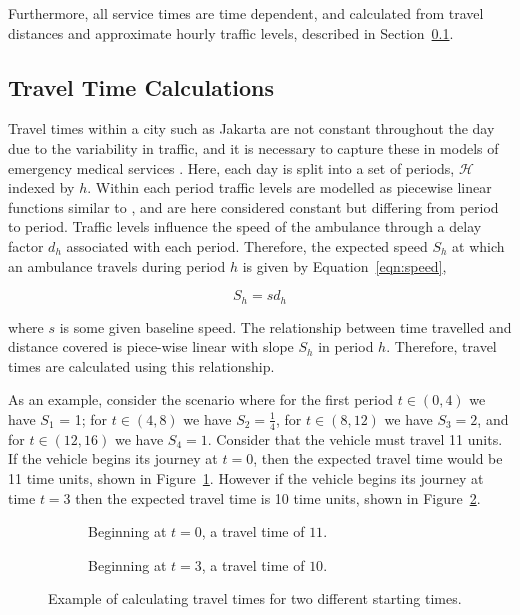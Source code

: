 \documentclass[preprint,12pt]{elsarticle}
\begin{document}
Furthermore, all service times are time dependent, and calculated from travel
distances and approximate hourly traffic levels, described in
Section~\ref{sec:travel_times}.

\subsection{Travel Time Calculations}\label{sec:travel_times}
Travel times within a city such as Jakarta are not constant throughout the day
due to the variability in traffic, and it is necessary to capture these in
models of emergency medical services \citep{schmiddoerner10}.
Here, each day is split into a set of periods, $\mathcal{H}$ indexed by $h$.
Within each period traffic levels are modelled as piecewise linear functions
similar to \cite{horn00}, and are here considered constant but differing from
period to period. Traffic levels influence the speed of the ambulance through a
delay factor $d_h$ associated with each period. Therefore, the expected speed
$S_h$ at which an ambulance travels during period $h$ is given by
Equation~\ref{eqn:speed},

\begin{equation}\label{eqn:speed}
S_h = s d_h
\end{equation}

\noindent
where $s$ is some given baseline speed. The relationship between time travelled
and distance covered is piece-wise linear with slope $S_h$ in period $h$.
Therefore, travel times are calculated using this relationship.

As an example, consider the scenario where for the first period $t \in (0, 4)$
we have $S_1$ = 1; for $t \in (4, 8)$ we have $S_2 = \frac{1}{4}$, for
$t \in (8, 12)$ we have $S_3 = 2$, and for $t \in (12, 16)$ we have $S_4 = 1$.
Consider that the vehicle must travel 11 units. If the vehicle begins its
journey at $t=0$, then the expected travel time would be 11 time units, shown
in Figure~\ref{fig:travel_times_1}. However if the vehicle begins its journey
at time $t=3$ then the expected travel time is 10 time units, shown in
Figure~\ref{fig:travel_times_2}.

\begin{figure}
    \begin{center}
    \begin{subfigure}{6.6cm}
    
    \caption{Beginning at $t=0$, a travel time of $11$.}
    \label{fig:travel_times_1}
    \end{subfigure}
    \begin{subfigure}{6.6cm}
    
    \caption{Beginning at $t=3$, a travel time of $10$.}
    \label{fig:travel_times_2}
    \end{subfigure}
    \end{center}
    \caption{Example of calculating travel times for two different starting
    times.}
    \label{fig:travel_times}
\end{figure}
\end{document}
